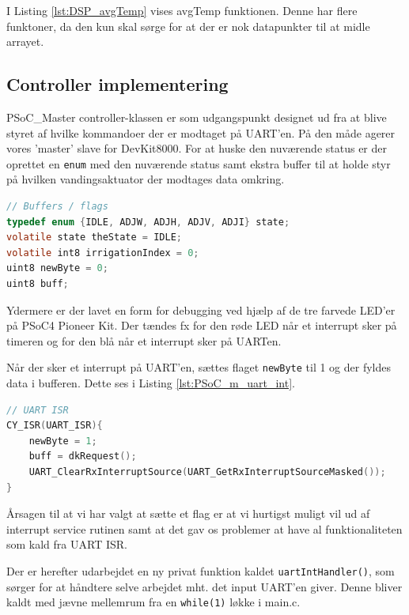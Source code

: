 I Listing \ref{lst:DSP_avgTemp} vises avgTemp funktionen. Denne har flere funktoner, da den kun skal sørge for at der er nok datapunkter til at midle arrayet.

\subsection{Controller implementering}

PSoC\_Master controller-klassen er som udgangspunkt designet ud fra at blive styret af hvilke kommandoer der er modtaget på UART'en. På den måde agerer vores 'master' slave for DevKit8000. 
For at huske den nuværende status er der oprettet en \texttt{enum} med den nuværende status samt ekstra buffer til at holde styr på hvilken vandingsaktuator der modtages data omkring.

\begin{lstlisting}[language=C, label=lst:PSoC_m_dec, caption=Deklaration af buffers og flag.]
// Buffers / flags
typedef enum {IDLE, ADJW, ADJH, ADJV, ADJI} state;
volatile state theState = IDLE;
volatile int8 irrigationIndex = 0;
uint8 newByte = 0;
uint8 buff;
\end{lstlisting}

Ydermere er der lavet en form for debugging ved hjælp af de tre farvede LED'er på PSoC4 Pioneer Kit. Der tændes fx for den røde LED når et interrupt sker på timeren og for den blå når et interrupt sker på UARTen.

Når der sker et interrupt på UART'en, sættes flaget \texttt{newByte} til 1 og der fyldes data i bufferen. Dette ses i Listing \ref{lst:PSoC_m_uart_int}.

\begin{lstlisting}[language=C, label=lst:PSoC_m_uart_int, caption=ISR for UART.]
// UART ISR
CY_ISR(UART_ISR){
    newByte = 1;
    buff = dkRequest();
    UART_ClearRxInterruptSource(UART_GetRxInterruptSourceMasked());     // Clear interrupt flag
}
\end{lstlisting}

Årsagen til at vi har valgt at sætte et flag er at vi hurtigst muligt vil ud af interrupt service rutinen samt at det gav os problemer at have al funktionaliteten som kald fra UART ISR.

Der er herefter udarbejdet en ny privat funktion kaldet \texttt{uartIntHandler()},  %
som sørger for at håndtere selve arbejdet mht. det input UART'en giver. 
Denne bliver kaldt med jævne mellemrum fra en \texttt{while(1)} løkke i main.c. 

